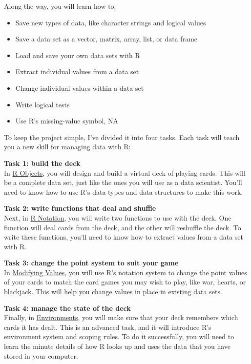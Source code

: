 \documentclass[
  letterpaper,
  DIV=11,
  numbers=noendperiod]{scrbook}
\providecommand{\tightlist}{%
  \setlength{\itemsep}{0pt}\setlength{\parskip}{0pt}}
\begin{document}
Along the way, you will learn how to:

\begin{itemize}
\tightlist
\item
  Save new types of data, like character strings and logical values
\item
  Save a data set as a vector, matrix, array, list, or data frame
\item
  Load and save your own data sets with R
\item
  Extract individual values from a data set
\item
  Change individual values within a data set
\item
  Write logical tests
\item
  Use R's missing-value symbol, NA
\end{itemize}

To keep the project simple, I've divided it into four tasks. Each task
will teach you a new skill for managing data with R:

\textbf{Task 1: build the deck}\\
In \hyperref[sec-r-objects]{R Objects}, you will design and build a
virtual deck of playing cards. This will be a complete data set, just
like the ones you will use as a data scientist. You'll need to know how
to use R's data types and data structures to make this work.

\textbf{Task 2: write functions that deal and shuffle}\\
Next, in \hyperref[sec-r-notation]{R Notation}, you will write two
functions to use with the deck. One function will deal cards from the
deck, and the other will reshuffle the deck. To write these functions,
you'll need to know how to extract values from a data set with R.

\textbf{Task 3: change the point system to suit your game}\\
In \hyperref[sec-modifying-values]{Modifying Values}, you will use R's
notation system to change the point values of your cards to match the
card games you may wish to play, like war, hearts, or blackjack. This
will help you change values in place in existing data sets.

\textbf{Task 4: manage the state of the deck}\\
Finally, in \hyperref[sec-environments]{Environments}, you will make
sure that your deck remembers which cards it has dealt. This is an
advanced task, and it will introduce R's environment system and scoping
rules. To do it successfully, you will need to learn the minute details
of how R looks up and uses the data that you have stored in your
computer.
\end{document}
